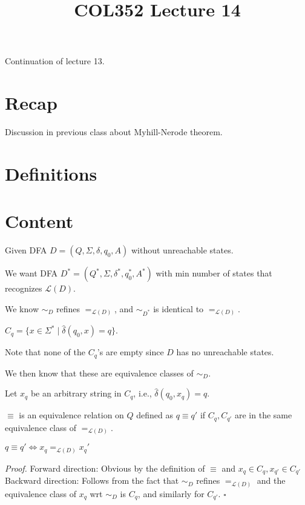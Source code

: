 \documentclass[a4paper]{article}
\title{\textbf{COL352 Lecture 14}}
\date{}
\newenvironment{proof}{\begin{breakbox}\textit{Proof.}}{\hfill$\square$\end{breakbox}}
\newcommand{\nl}{\vspace{0.2cm}\\}
\newcommand{\mc}{\mathcal}
\renewcommand{\L}{\mc{L}}
\newcommand{\hd}{\hat{\delta}}
\begin{document}
\maketitle
\tableofcontents

Continuation of lecture 13.

\section{Recap}

Discussion in previous class about Myhill-Nerode theorem.

\section{Definitions}

\section{Content}

Given DFA $D = (Q, \Sigma, \delta, q_0, A)$ without unreachable states.

We want DFA $D^* = (Q^*, \Sigma, \delta^*, q_0^*, A^*)$ with min number of states that recognizes $\L(D)$.

We know $\sim_D$ refines $=_{\L(D)}$, and $\sim_{D^*}$ is identical to $=_{\L(D)}$.

\begin{defn}
$C_q = \{x \in \Sigma^* \mid \hd(q_0, x) = q\}$.
\end{defn}

Note that none of the $C_q$'s are empty since $D$ has no unreachable states.

We then know that these are equivalence classes of $\sim_D$.

Let $x_q$ be an arbitrary string in $C_q$, i.e., $\hd(q_0, x_q) = q$.

\begin{defn}
    $\equiv$ is an equivalence relation on $Q$ defined as $q \equiv q'$ if $C_q, C_{q'}$ are in the same equivalence class of $=_{\L(D)}$.
\end{defn}

\begin{claim}
    $q \equiv q' \iff x_q =_{\L(D)} x_q'$
\end{claim}

\begin{proof}
    Forward direction: Obvious by the definition of $\equiv$ and $x_q \in C_q, x_{q'} \in C_{q'}$\nl
    Backward direction: Follows from the fact that $\sim_D$ refines $=_{\L(D)}$ and the equivalence class of $x_q$ wrt $\sim_D$ is $C_q$, and similarly for $C_{q'}$.
\end{proof}
\end{document}
